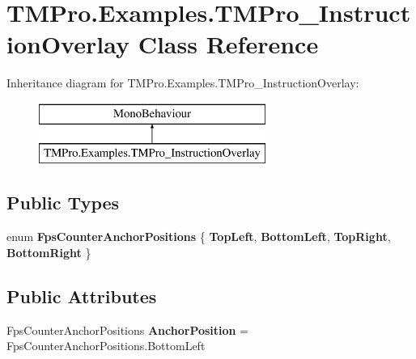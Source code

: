 \hypertarget{class_t_m_pro_1_1_examples_1_1_t_m_pro___instruction_overlay}{}\section{T\+M\+Pro.\+Examples.\+T\+M\+Pro\+\_\+\+Instruction\+Overlay Class Reference}
\label{class_t_m_pro_1_1_examples_1_1_t_m_pro___instruction_overlay}
Inheritance diagram for T\+M\+Pro.\+Examples.\+T\+M\+Pro\+\_\+\+Instruction\+Overlay\+:\begin{figure}[H]
\begin{center}
\leavevmode
\includegraphics[height=2.000000cm]{class_t_m_pro_1_1_examples_1_1_t_m_pro___instruction_overlay}
\end{center}
\end{figure}
\subsection*{Public Types}
\begin{DoxyCompactItemize}
\item 
\mbox{\label{class_t_m_pro_1_1_examples_1_1_t_m_pro___instruction_overlay_a857c25d1c96e819dc39011d143ce3415}} 
enum {\bfseries Fps\+Counter\+Anchor\+Positions} \{ {\bfseries Top\+Left}, 
{\bfseries Bottom\+Left}, 
{\bfseries Top\+Right}, 
{\bfseries Bottom\+Right}
 \}
\end{DoxyCompactItemize}
\subsection*{Public Attributes}
\begin{DoxyCompactItemize}
\item 
\mbox{\label{class_t_m_pro_1_1_examples_1_1_t_m_pro___instruction_overlay_a711b531b8ed7c421f67b1ee9b32b36dd}} 
Fps\+Counter\+Anchor\+Positions {\bfseries Anchor\+Position} = Fps\+Counter\+Anchor\+Positions.\+Bottom\+Left
\end{DoxyCompactItemize}
